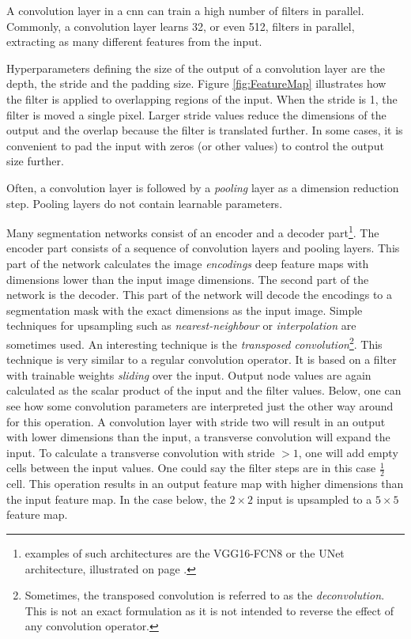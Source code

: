 \par{
    A convolution layer in a \Gls{cnn} can train a high number of filters in parallel.
    Commonly, a convolution layer learns 32, or even 512, filters in parallel, extracting as many different features from the input. 
}
\par{
    Hyperparameters defining the size of the output of a convolution layer are the depth, the stride and the padding size.
    Figure \ref{fig:FeatureMap} illustrates how the filter is applied to overlapping regions of the input. When the stride is 1, the filter is moved a single pixel.
    Larger stride values reduce the dimensions of the output and the overlap because the filter is translated further.
    In some cases, it is convenient to pad the input with zeros (or other values) to control the output size further.}

\par{
    Often, a convolution layer is followed by a \textit{pooling} layer as a dimension reduction step.
    Pooling layers do not contain learnable parameters.
}

\par{
    Many segmentation networks consist of an encoder and a decoder part\footnote{examples of such architectures are the VGG16-FCN8 or the UNet architecture, illustrated on page \pageref{fig:vgg16}.}.
    The encoder part consists of a sequence of convolution layers and pooling layers. 
    This part of the network calculates the image \textit{encodings} deep feature maps with dimensions lower than the input image dimensions.
    The second part of the network is the decoder. This part of the network will decode the encodings to a segmentation mask with the exact dimensions as the input image.
    Simple techniques for upsampling such as \textit{nearest-neighbour} or \textit{interpolation} are sometimes used.
    An interesting technique is the \textit{transposed convolution}\footnote{Sometimes, the transposed convolution is referred to as the \textit{deconvolution}. This is not an exact formulation as it is not intended to reverse the effect of any convolution operator.}. 
    This technique is very similar to a regular convolution operator. It is based on a filter with trainable weights \textit{sliding} over the input.
    Output node values are again calculated as the scalar product of the input and the filter values.
    Below, one can see how some convolution parameters are interpreted just the other way around for this operation.
    A convolution layer with stride two will result in an output with lower dimensions than the input, a transverse convolution will expand the input.
    To calculate a transverse convolution with stride $>1$, one will add empty cells between the input values. 
    One could say the filter steps are in this case $\frac{1}{2}$ cell.
    This operation results in an output feature map with higher dimensions than the input feature map. In the case below, the $2\times 2$ input is upsampled to a $5\times 5$ feature map.
}


